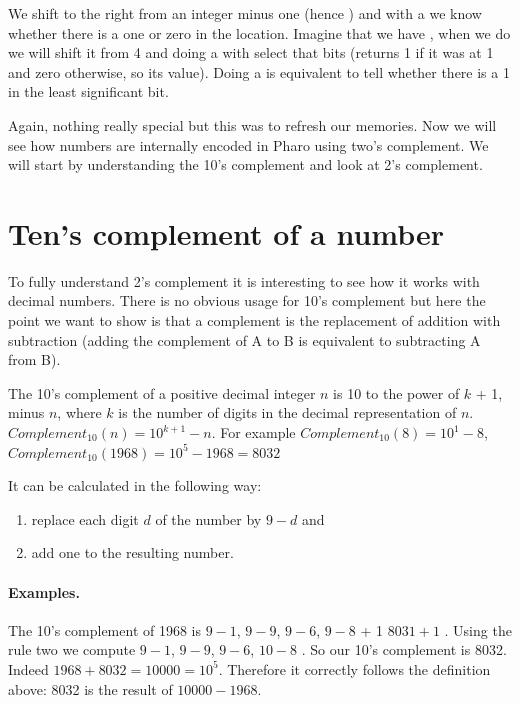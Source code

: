 \documentclass[a4paper,10pt,twoside]{book}
\begin{document}
We shift to the right from an integer minus one (hence ) and with a  we know whether there is a one or zero in the location. Imagine that we have , when we do  we will shift it from 4 and doing a  with select that bits (\ie returns 1 if it was at 1 and zero otherwise, so its value).   Doing a  is equivalent to tell whether there is a 1 in the least significant bit.

Again, nothing really special but this was to refresh our memories. Now we will see how numbers are internally encoded in Pharo using two's complement. We will start by understanding the 10's complement and look at 2's complement. 

\section{Ten's complement of a number}

To fully understand 2's complement it is interesting to see how it works with decimal numbers. There is no obvious usage for 10's complement but here the point we want to show is that a complement is the replacement of addition with subtraction (\ie adding the complement of A to B is equivalent to subtracting A from B).


The 10's complement of a positive decimal integer $n$ is 10 to the power of $k$ + 1, minus $n$, where $k$ is the number of digits in the decimal representation of $n$. $Complement_{10}(n) = 10^{k+1} - n$.
For example $Complement_{10}(8)= 10^1-8$, $Complement_{10}(1968)=10^{5}-1968=8032$



It can be calculated in the following way: 
\begin{enumerate}
\item replace each digit $d$ of the number by $9-d$ and  
\item add one to the resulting number.
\end{enumerate}


\paragraph{Examples.}
The 10's complement of 1968 is $9-1$, $9-9$, $9-6$, $9-8$ + 1 \ie $8031 + 1$ . 
Using the rule two we compute $9-1$, $9-9$, $9-6$, $10-8$ . So our 10's complement is 8032. Indeed $1968 + 8032 = 10000 = 10^{5}$. Therefore it correctly follows the definition above: 8032 is the result of $10000 - 1968$.
\end{document}

